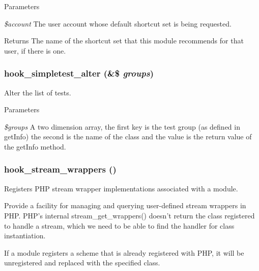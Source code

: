 \begin{DoxyParams}{Parameters}
\item[{\em \$account}]The user account whose default shortcut set is being requested. \end{DoxyParams}
\begin{DoxyReturn}{Returns}
The name of the shortcut set that this module recommends for that user, if there is one. 
\end{DoxyReturn}
\hypertarget{group__hooks_ga0e2bc56b600a923dff7c800e644e0d4d}{
\subsubsection[{hook\_\-simpletest\_\-alter}]{\setlength{\rightskip}{0pt plus 5cm}hook\_\-simpletest\_\-alter (\&\$ {\em groups})}}
\label{group__hooks_ga0e2bc56b600a923dff7c800e644e0d4d}
Alter the list of tests.


\begin{DoxyParams}{Parameters}
\item[{\em \$groups}]A two dimension array, the first key is the test group (as defined in getInfo) the second is the name of the class and the value is the return value of the getInfo method. \end{DoxyParams}
\hypertarget{group__hooks_ga6fadcf625a4766e7f0d97b1628b294dc}{
\subsubsection[{hook\_\-stream\_\-wrappers}]{\setlength{\rightskip}{0pt plus 5cm}hook\_\-stream\_\-wrappers ()}}
\label{group__hooks_ga6fadcf625a4766e7f0d97b1628b294dc}
Registers PHP stream wrapper implementations associated with a module.

Provide a facility for managing and querying user-\/defined stream wrappers in PHP. PHP's internal stream\_\-get\_\-wrappers() doesn't return the class registered to handle a stream, which we need to be able to find the handler for class instantiation.

If a module registers a scheme that is already registered with PHP, it will be unregistered and replaced with the specified class.

